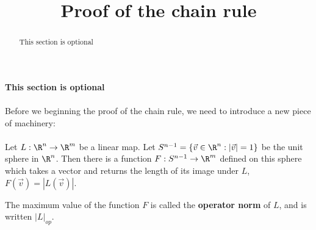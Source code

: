 \documentclass{ximera}
\title{Proof of the chain rule}
\begin{document}
	\begin{abstract}
		This section is optional
	\end{abstract}\maketitle
	
	\textbf{This section is optional}
	\\
	\\
	Before we beginning the proof of the chain rule, we need to introduce a new piece of machinery:
	\\
	\\
	Let $L:\R^n \to \R^m$ be a linear map.  Let $S^{n-1} = \{ \vec{v} \in \R^n: |\vec{v}|  = 1\}$ be the unit sphere in $\R^n$.  Then there is a function
		$F: S^{n-1} \to \R^m$ defined on this sphere which takes a vector and returns the length of its image under $L$, $F(\vec{v}) = |L(\vec{v})|$.  
		
	\begin{definition}
		The maximum value of the function $F$ is called the \textbf{operator norm} of $L$, and is written $|L|_{op}$.
	\end{definition}
	
\end{document}
